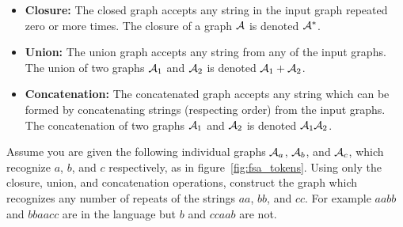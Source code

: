 \begin{itemize}
    \item {\bf Closure:} The closed graph accepts any string in the input graph
        repeated zero or more times. The closure of a graph $\mathcal{A}$ is denoted
        $\mathcal{A}^*$.

    \item {\bf Union:} The union graph accepts any string from any of the input
        graphs. The union of two graphs $\mathcal{A}_1$ and $\mathcal{A}_2$ is denoted $\mathcal{A}_1 +
        \mathcal{A}_2$.

    \item {\bf Concatenation:} The concatenated graph accepts any string which
        can be formed by concatenating strings (respecting order) from the
        input graphs. The concatenation of two graphs $\mathcal{A}_1$ and $\mathcal{A}_2$ is
        denoted $\mathcal{A}_1\mathcal{A}_2$.

\end{itemize}

\begin{example}
Assume you are given the following individual graphs $\mathcal{A}_a$, $\mathcal{A}_b$, and
$\mathcal{A}_c$, which recognize $a$, $b$, and $c$ respectively, as in
figure~\ref{fig:fsa_tokens}. Using only the closure, union, and
concatenation operations, construct the graph which recognizes any number
of repeats of the strings $aa$, $bb$, and $cc$. For example $aabb$ and
$bbaacc$ are in the language but $b$ and $ccaab$ are not.
\end{example}

